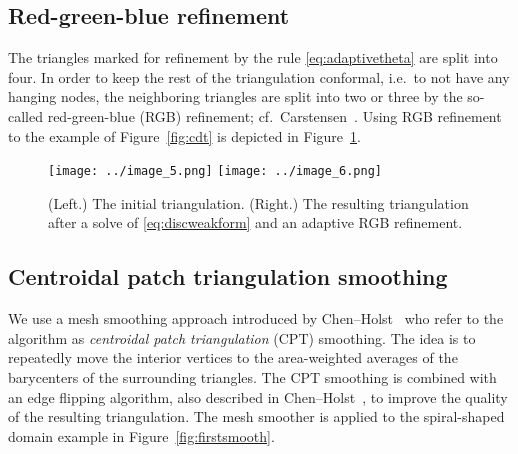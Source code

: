\documentclass[12pt]{article}
\begin{document}
\subsection{Red-green-blue refinement}
\label{sec:rgb}

The triangles marked for refinement by the rule \eqref{eq:adaptivetheta} are
split into four.  In order to keep the rest of the triangulation conformal,
i.e.~to not have any hanging nodes, the neighboring triangles are split into two or
three by the so-called red-green-blue (RGB)
refinement; cf.~Carstensen~\cite{carstensen2004adaptive}.
Using RGB refinement to the example of Figure~\ref{fig:cdt}
is depicted in Figure~\ref{fig:firstrgb}.

\begin{figure}[htbp]
\centering
\texttt{[image: ../image\_5.png]}
\texttt{[image: ../image\_6.png]}
\caption{(Left.) The initial triangulation. (Right.) The resulting triangulation
  after a solve of \eqref{eq:discweakform} and an adaptive RGB refinement.}
\label{fig:firstrgb}
\end{figure}

\subsection{Centroidal patch triangulation smoothing}
\label{sec:cpt}

We use a mesh smoothing approach introduced by Chen--Holst~\cite{Chen_2011} who
refer to the algorithm as \emph{centroidal patch triangulation} (CPT) smoothing.
The idea is to repeatedly move the interior vertices to the area-weighted
averages of the barycenters of the surrounding triangles.  The CPT smoothing is
combined with an edge flipping algorithm, also described in
Chen--Holst~\cite{Chen_2011}, to improve the quality of the resulting
triangulation.  The mesh smoother is applied to the spiral-shaped domain example 
in Figure~\ref{fig:firstsmooth}.

\end{document}
